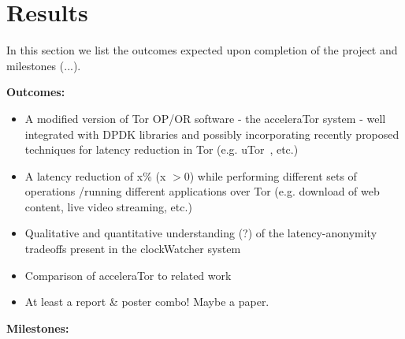 \section{Results}
\label{sec:results}

In this section we list the outcomes expected upon completion of the project 
and milestones (...).



\textbf{Outcomes:}

\begin{itemize}
	
	\item A modified version of Tor OP\slash OR software - the acceleraTor 
	system - well integrated with DPDK libraries and possibly incorporating 
	recently proposed techniques for latency reduction in Tor (e.g. 
	uTor~\cite{179191}, etc.)
	
	\item A latency reduction of x\% (x $> 0$) while performing different sets 
	of operations \slash running different applications over Tor (e.g. download 
	of web content, live video streaming, etc.)
	
	\item Qualitative and quantitative understanding (?) of the 
	latency-anonymity tradeoffs present in the clockWatcher system
	
	\item Comparison of acceleraTor to related work
	
	\item At least a report \& poster combo! Maybe a paper.

\end{itemize}

\textbf{Milestones:}

